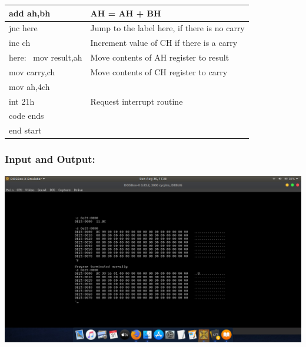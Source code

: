 \documentclass[12pt,a4paper]{article}
\begin{document}
\begin{flushleft}
\begin{table}[htb]
{\begin{tabular}{|l|l|}
\hline
add ah,bh                                                        & AH = AH + BH                                  \\ 
\hline
jnc here                                                         & Jump to the label here, if there is no carry  \\ 
\hline
inc ch                                                           & Increment value of CH if there is a carry     \\ 
\hline
here:~ mov result,ah                                             & Move contents of AH register to result        \\ 
\hline
mov carry,ch                                                     & Move contents of CH register to carry         \\ 
\hline
mov ah,4ch                                                       &                                               \\ 
\hline
int 21h                                                          & Request interrupt routine                     \\ 
\hline
code ends                                                        &                                               \\ 
\hline
end start                                                        &                                               \\
\hline
\end{tabular}
}
\end{table}

\subsubsection*{\textbf{Input and Output:}}
\includegraphics[trim = 100mm 60mm 100mm 80mm, clip, width = \textwidth]{Addition.png}


\end{flushleft}
\end{document}
